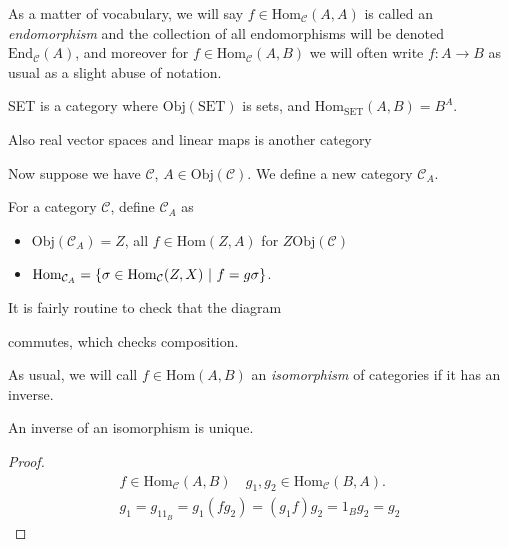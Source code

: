 \documentclass[12pt, twosided]{article}
\begin{document}
As a matter of vocabulary, we will say \(f \in \mathrm{Hom}_\mathcal{C}(A, A)\) is called an \textit{endomorphism} and the collection of all endomorphisms will be denoted \(\mathrm{End}_\mathcal{C}(A)\), and moreover for \(f \in \mathrm{Hom}_\mathcal{C}(A,B)\)  we will often write \(f: A \to B\) as usual as a slight abuse of notation.

\begin{exa}
  SET is a category where \(\mathrm{Obj}(\mathrm{SET})\) is sets, and \(\mathrm{Hom}_\mathrm{SET}(A, B) = B^A\).
\end{exa}
\begin{exa}
  Also real vector spaces and linear maps is another category
\end{exa}
Now suppose we have \(\mathcal{C}\), \(A \in \mathrm{Obj}(\mathcal{C})\). We define a new category \(\mathcal{C}_A\).

\begin{df}
  For a category \(\mathcal{C}\), define \(\mathcal{C}_A\) as
  \begin{itemize}
  \item \(\mathrm{Obj}(\mathcal{C}_A) = Z\), all \(f \in \mathrm{Hom}(Z, A)\) for \(Z \mathrm{Obj}(\mathcal{C})\)
  \item \(\mathrm{Hom}_{\mathcal{C}_A} = \left\{ \sigma \in \mathrm{Hom}_\mathcal{C}(Z, X) \ \middle\vert\  f = g\sigma\right\}\).
  \end{itemize}
\end{df}
It is fairly routine to check that the diagram

\begin{center}
\end{center}

commutes, which checks composition.

As usual, we will call \(f \in \mathrm{Hom}(A, B)\) an \textit{isomorphism} of categories if it has an inverse.

\begin{prop}
  An inverse of an isomorphism is unique.
\end{prop}
\begin{proof}
  \begin{align*}
    f \in \mathrm{Hom}_\mathcal{C}(A, B) \quad g_1, g_2 \in \mathrm{Hom}_\mathcal{C}(B, A). \\
    g_1 = g_11_B = g_1(fg_2) = (g_1f)g_2 = 1_Bg_2 = g_2
  \end{align*}
\end{proof}
\end{document}
